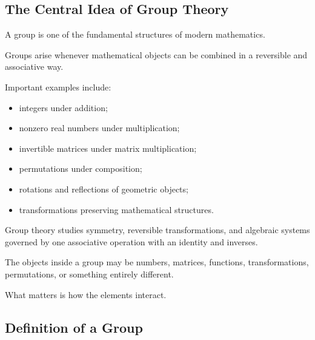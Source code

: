\subsection{The Central Idea of Group Theory}
\label{subsec:central-idea-group-theory}

A group is one of the fundamental structures of modern mathematics.

Groups arise whenever mathematical objects can be combined in a reversible
and associative way.

Important examples include:

\begin{itemize}
    \item integers under addition;
    \item nonzero real numbers under multiplication;
    \item invertible matrices under matrix multiplication;
    \item permutations under composition;
    \item rotations and reflections of geometric objects;
    \item transformations preserving mathematical structures.
\end{itemize}

\begin{conceptbox}
Group theory studies symmetry, reversible transformations, and algebraic
systems governed by one associative operation with an identity and inverses.
\end{conceptbox}

The objects inside a group may be numbers, matrices, functions,
transformations, permutations, or something entirely different.

What matters is how the elements interact.

\subsection{Definition of a Group}
\label{subsec:definition-group}

